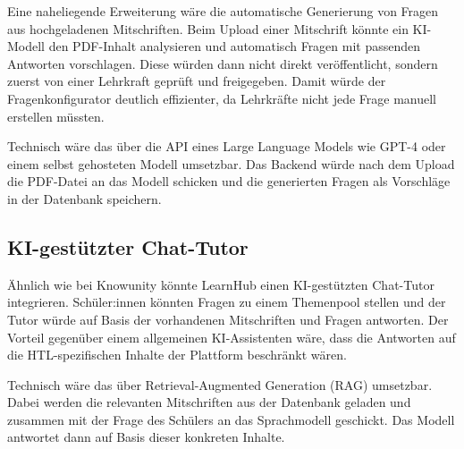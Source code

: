 Eine naheliegende Erweiterung wäre die automatische Generierung von 
Fragen aus hochgeladenen Mitschriften. Beim Upload einer Mitschrift 
könnte ein KI-Modell den PDF-Inhalt analysieren und automatisch 
Fragen mit passenden Antworten vorschlagen. Diese würden dann nicht 
direkt veröffentlicht, sondern zuerst von einer Lehrkraft geprüft 
und freigegeben. Damit würde der Fragenkonfigurator deutlich 
effizienter, da Lehrkräfte nicht jede Frage manuell erstellen 
müssten.

Technisch wäre das über die API eines Large Language Models wie 
GPT-4 oder einem selbst gehosteten Modell umsetzbar. Das Backend 
würde nach dem Upload die PDF-Datei an das Modell schicken und 
die generierten Fragen als Vorschläge in der Datenbank speichern.

\subsection{KI-gestützter Chat-Tutor}

Ähnlich wie bei Knowunity könnte LearnHub einen KI-gestützten 
Chat-Tutor integrieren. Schüler:innen könnten Fragen zu einem 
Themenpool stellen und der Tutor würde auf Basis der vorhandenen 
Mitschriften und Fragen antworten. Der Vorteil gegenüber einem 
allgemeinen KI-Assistenten wäre, dass die Antworten auf die 
HTL-spezifischen Inhalte der Plattform beschränkt wären.

Technisch wäre das über Retrieval-Augmented Generation (RAG) 
umsetzbar. Dabei werden die relevanten Mitschriften aus der 
Datenbank geladen und zusammen mit der Frage des Schülers an 
das Sprachmodell geschickt. Das Modell antwortet dann auf Basis 
dieser konkreten Inhalte.